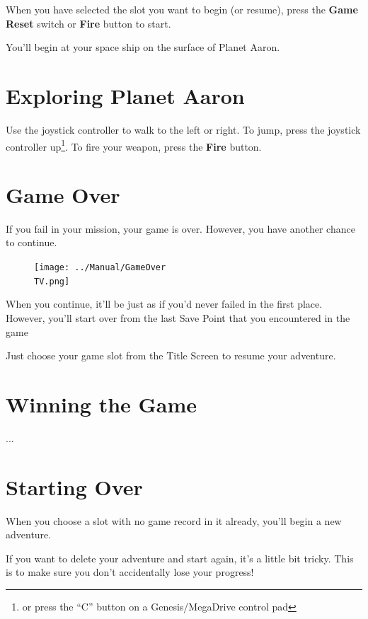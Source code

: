 \documentclass[10pt,twocolumn,openany,article]{memoir}
\newcommand\TV{NTSC}
\newcommand\TV{PAL}
\newcommand\TV{SECAM}
\begin{document}
When you have selected the slot you want to begin (or resume), press the
\textbf{Game Reset} switch or \textbf{Fire} button to start.

\fi

You'll begin at your space ship on the surface of Planet Aaron.

\section{Exploring Planet Aaron}

Use the joystick controller to walk to the left or right. To jump, press
the   joystick   controller  up\footnote{or   press   the  ``C''   button   on
a  Genesis/MegaDrive  control  pad}.  To fire  your  weapon,  press  the
\textbf{Fire} button. 

\section{Game Over}

If  you fail  in your  mission,  your game  is over.  However, you  have
another chance to continue.

\begin{figure}[b]
  \begin{center}
    \texttt{[image: ../Manual/GameOver\\TV.png]}
  \end{center}
\end{figure}

When you continue, it'll  be just as if you'd never  failed in the first
place. However,  you'll start  over from  the last  Save Point  that you
encountered in the game

Just  choose   your  game   slot  from  the   Title  Screen   to  resume
your adventure.

\section{Winning the Game}

...

\section{Starting Over}\label{Starting Your Adventure Over}

When you choose a  slot with no game record in  it already, you'll begin
a new adventure.

If you want to delete your adventure  and start again, it's a little bit
tricky. This is to make sure you don't accidentally lose your progress!
\end{document}
